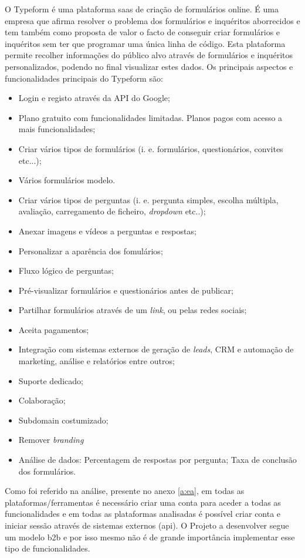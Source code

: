 O Typeform é uma plataforma \acrshort{saas} de criação de formulários online. É uma empresa que afirma resolver o problema dos formulários e inquéritos aborrecidos e tem também como proposta de valor o facto de conseguir criar formulários e inquéritos sem ter que programar uma única linha de código. Esta plataforma permite recolher informações do público alvo através de formulários e inquéritos personalizados, podendo no final visualizar estes dados. 
Os principais aspectos e funcionalidades principais do Typeform são:
\begin{itemize}
	\setlength{\itemsep}{1pt}
	\item Login e registo através da API do Google;
	\item Plano gratuito com funcionalidades limitadas. Planos pagos com acesso a mais funcionalidades;
	\item Criar vários tipos de formulários (i. e. formulários, questionários, convites etc...);
	\item Vários formulários modelo.
	\item Criar vários tipos de perguntas (i. e. pergunta simples, escolha múltipla, avaliação, carregamento de ficheiro, \textit{dropdown} etc..); 
	\item Anexar imagens e vídeos a perguntas e respostas;
	\item Personalizar a aparência dos fomulários; 
	\item Fluxo lógico de perguntas; 
	\item Pré-visualizar formulários e questionários antes de publicar;
	\item Partilhar formulários através de um \textit{link}, ou pelas redes sociais;
	\item Aceita pagamentos;
	\item Integração com sistemas externos de geração de \textit{leads}, CRM e automação de marketing, análise e relatórios entre outros;
	\item Suporte dedicado;
	\item Colaboração;
	\item Subdomain costumizado;
	\item Remover \textit{branding}
	\item Análise de dados:
		\subitem Percentagem de respostas por pergunta;
		\subitem Taxa de conclusão dos formulários.
	
\end{itemize}


Como foi referido na análise, presente no anexo \ref{a:ea}, em todas as plataformas/ferramentas é necessário criar uma conta para aceder a todas as funcionalidades e em todas as plataformas analisadas é possível criar conta e iniciar sessão através de sistemas externos (\acrshort{api}). O Projeto a desenvolver segue um modelo \gls{b2b} e por isso mesmo não é de grande importância implementar esse tipo de funcionalidades.

